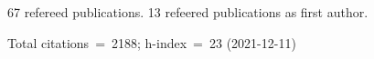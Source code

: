 67 refereed publications. 13 refeered publications as first author.

Total citations~=~2188; h-index~=~23 (2021-12-11)